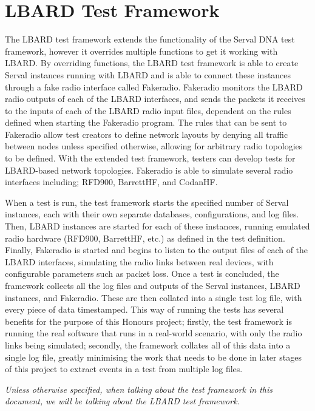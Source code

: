 \section{LBARD Test Framework}
The LBARD test framework extends the functionality of the Serval DNA test framework, however it overrides multiple functions to get it working with LBARD.
By overriding functions, the LBARD test framework is able to create Serval instances running with LBARD and is able to connect these instances through a fake radio interface called Fakeradio.
Fakeradio monitors the LBARD radio outputs of each of the LBARD interfaces, and sends the packets it receives to the inputs of each of the LBARD radio input files, dependent on the rules defined when starting the Fakeradio program.
The rules that can be sent to Fakeradio allow test creators to define network layouts by denying all traffic between nodes unless specified otherwise, allowing for arbitrary radio topologies to be defined.
With the extended test framework, testers can develop tests for LBARD-based network topologies.
Fakeradio is able to simulate several radio interfaces including; RFD900, BarrettHF, and CodanHF.


When a test is run, the test framework starts the specified number of Serval instances, each with their own separate databases, configurations, and log files.
Then, LBARD instances are started for each of these instances, running emulated radio hardware (RFD900, BarrettHF, etc.) as defined in the test definition.
Finally, Fakeradio is started and begins to listen to the output files of each of the LBARD interfaces, simulating the radio links between real devices, with configurable parameters such as packet loss.
Once a test is concluded, the framework collects all the log files and outputs of the Serval instances, LBARD instances, and Fakeradio.
These are then collated into a single test log file, with every piece of data timestamped.
This way of running the tests has several benefits for the purpose of this Honours project; firstly, the test framework is running the real software that runs in a real-world scenario, with only the radio links being simulated; secondly, the framework collates all of this data into a single log file, greatly minimising the work that needs to be done in later stages of this project to extract events in a test from multiple log files.

\emph{Unless otherwise specified, when talking about the test framework in this document, we will be talking about the LBARD test framework.}


